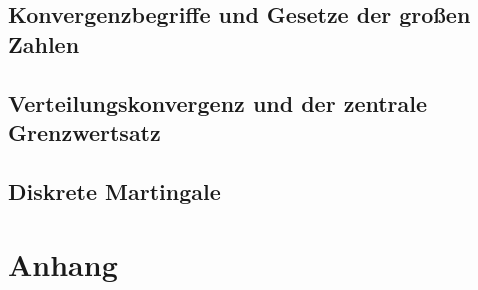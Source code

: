 \documentclass[ngerman,a4paper,order=firstname]{local_mathscript} %
\begin{document}
\chapter{Konvergenzbegriffe und Gesetze der großen Zahlen}




\chapter{Verteilungskonvergenz und der zentrale Grenzwertsatz}


\chapter{Diskrete Martingale}


\part*{Anhang}
\appendix

\nocite{*}




\printindex
\end{document}
